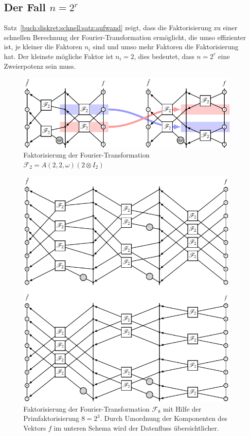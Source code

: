 %
%
\subsection{Der Fall $n=2^r$
\label{buch:diskret:schnell:subsection:n=2r}}
Satz~\ref{buch:diskret:schnell:satz:aufwand} zeigt, dass 
die Faktorisierung zu einer schnellen Berechnung der Fourier-Transformation
ermöglicht, die umso effizienter ist, je kleiner die Faktoren $n_i$
sind und umso mehr Faktoren die Faktorisierung hat.
Der kleinste mögliche Faktor ist $n_i=2$, dies bedeutet, dass $n=2^r$
eine Zweierpotenz sein muss.

\begin{figure}
\centering
\includegraphics{chapters/060-diskret/images/f4.pdf}
\caption{Faktorisierung der Fourier-Transformation $\mathscr{F}_2
= A(2,2,\omega) (\mathscr{2}\otimes I_2)$
\label{buch:diskret:schnell:fig:f4}}
\end{figure}%
\begin{figure}
\centering
\includegraphics{chapters/060-diskret/images/f8.pdf}
\caption{Faktorisierung der Fourier-Transformation $\mathscr{F}_8$
mit Hilfe der Primfaktorisierung $8=2^3$.
Durch Umordnung der Komponenten des Vektors $f$ im unteren Schema
wird der Datenfluss übersichtlicher.
\label{buch:diskret:schnell:fig:f8}}
\end{figure}%
